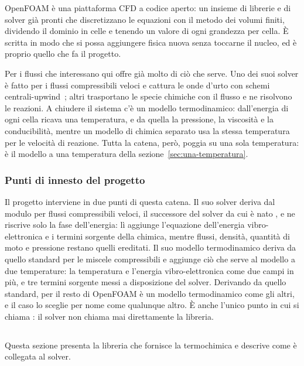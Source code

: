 OpenFOAM è una piattaforma CFD a codice aperto: un insieme
di librerie e di
solver già pronti che discretizzano le equazioni con il metodo dei volumi
finiti, dividendo il dominio in celle e tenendo un valore di ogni grandezza per
cella. È scritta in modo che si possa aggiungere fisica nuova senza toccarne il
nucleo, ed è proprio quello che fa il progetto.

Per i flussi che interessano qui offre già molto di ciò che serve. Uno dei suoi
solver è fatto per i flussi compressibili veloci e cattura le onde d'urto con
schemi centrali-upwind~\cite{kurganov2001,greenshields2010}; altri trasportano
le specie chimiche con il flusso e ne risolvono le reazioni. A chiudere il
sistema c'è un modello termodinamico: dall'energia di ogni cella ricava una
temperatura, e da quella la pressione, la viscosità e la conducibilità, mentre
un modello di chimica separato usa la stessa temperatura per le velocità di
reazione. Tutta la catena, però, poggia su una sola temperatura: è
il modello a una temperatura della sezione~\ref{sec:una-temperatura}.

\subsubsection{Punti di innesto del progetto}
\label{sec:openfoam-innesto}

Il progetto interviene in due punti di questa catena. Il suo solver deriva dal modulo per flussi compressibili
veloci, il successore del solver da cui è nato \hyfoam, e ne riscrive solo la fase dell'energia: lì aggiunge
l'equazione dell'energia vibro-elettronica e i termini sorgente della chimica,
mentre flussi, densità, quantità di moto e pressione restano quelli ereditati.
Il suo modello termodinamico deriva da quello standard per le miscele
compressibili e aggiunge ciò che serve al modello a due temperature: la
temperatura e l'energia vibro-elettronica come due campi in più, e tre termini
sorgente messi a disposizione del solver. Derivando da quello standard, per il
resto di OpenFOAM è un modello termodinamico come gli altri, e il caso lo
sceglie per nome come qualunque altro. È anche l'unico punto in cui si chiama
\mpp: il solver non chiama mai direttamente la libreria.

\subsection{\mpp}
\label{sec:mutation}

Questa sezione presenta la libreria che fornisce la termochimica e descrive
come è collegata al solver.

